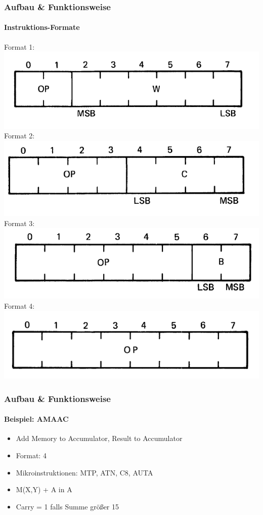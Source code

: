 \begin{frame}
\frametitle{Aufbau \& Funktionsweise}
	\framesubtitle{Instruktions-Formate}
		\begin{center}
			Format 1: \\
			\includegraphics[scale=0.25]{images/I1.PNG} \\ \pause
			Format 2: \\
			\includegraphics[scale=0.25]{images/I2.PNG} \\ \pause
			Format 3: \\
			\includegraphics[scale=0.25]{images/I3.PNG} \\ \pause
			Format 4: \\
			\includegraphics[scale=0.25]{images/I4.PNG} \\ 
		\end{center}
\end{frame}


\begin{frame}
\frametitle{Aufbau \& Funktionsweise}
	\framesubtitle{Beispiel: AMAAC}
		\begin{itemize}
			\item Add Memory to Accumulator, Result to Accumulator \pause
			\item Format: 4 \pause
			\item Mikroinstruktionen: MTP, ATN, C8, AUTA \pause
			\item M(X,Y) + A in A \pause
			\item Carry = 1 falls Summe gr{\"o}{\ss}er 15
		\end{itemize}
\end{frame}

